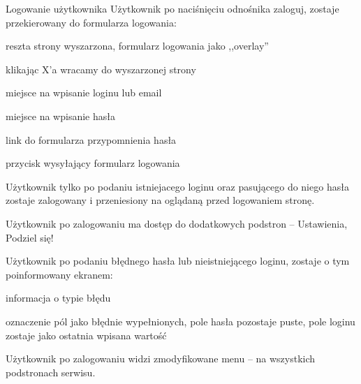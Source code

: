 \begin{userstory}{Logowanie użytkownika}
    Użytkownik po naciśnięciu odnośnika zaloguj,
    zostaje przekierowany do formularza logowania:
    \begin{packed_enum}
        \item reszta strony wyszarzona, formularz logowania jako ,,overlay''
        \item klikając X'a wracamy do wyszarzonej strony
        \item miejsce na wpisanie loginu lub email
        \item miejsce na wpisanie hasła
        \item link do formularza przypomnienia hasła
        \item przycisk wysyłający formularz logowania
    \end{packed_enum}
    
    \begin{tests}
        \item{
            Użytkownik tylko po podaniu istniejacego loginu oraz pasującego do niego hasła
            zostaje zalogowany i przeniesiony na oglądaną przed logowaniem stronę.
        }
        \item{
            Użytkownik po zalogowaniu ma dostęp do dodatkowych podstron -- Ustawienia, Podziel się!
        }
        \item{
            Użytkownik po podaniu błędnego hasła lub nieistniejącego loginu, zostaje o tym poinformowany ekranem:
            \begin{packed_enum}
                \item informacja o typie błędu
                \item oznaczenie pól jako błędnie wypełnionych, pole hasła pozostaje puste, pole loginu zostaje jako ostatnia wpisana wartość
            \end{packed_enum}
        }
        \item{Użytkownik po zalogowaniu widzi zmodyfikowane menu -- na wszystkich podstronach serwisu.}
    \end{tests}
\end{userstory}

